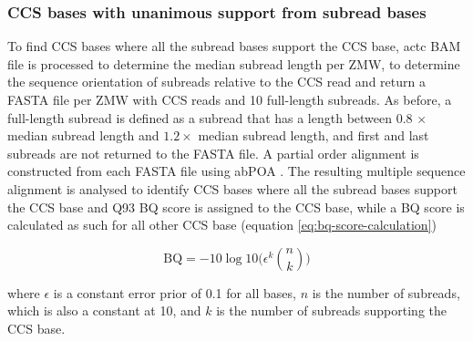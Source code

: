 \subsubsection{CCS bases with unanimous support from subread bases}

To find CCS bases where all the subread bases support the CCS base, actc BAM file is processed to determine the median subread length per ZMW, to determine the sequence orientation of subreads relative to the CCS read and return a FASTA file per ZMW with CCS reads and 10 full-length subreads. As before, a full-length subread is defined as a subread that has a length between 0.8 $\times$ median subread length and $1.2 \times$ median subread length, and first and last subreads are not returned to the FASTA file. A partial order alignment is constructed from each FASTA file using abPOA \cite{Gao2021-nf}. The resulting multiple sequence alignment is analysed to identify CCS bases where all the subread bases support the CCS base and Q93 BQ score is assigned to the CCS base, while a BQ score is calculated as such for all other CCS base (equation \ref{eq:bq-score-calculation})

\begin{equation}
\text{BQ} = -10\log10 \Biggl(\epsilon^k {n \choose k}\Biggl)
\label{eq:bq-score-calculation}
\end{equation}

where $\epsilon$ is a constant error prior of 0.1 for all bases, $n$ is the number of subreads, which is also a constant at 10, and $k$ is the number of subreads supporting the CCS base.

